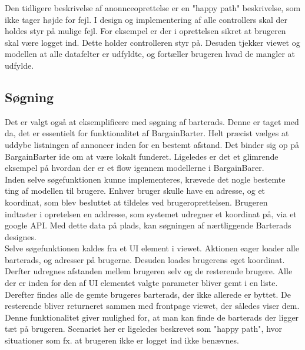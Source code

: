 \noindent Den tidligere beskrivelse af anonnceoprettelse er en "happy path" beskrivelse, som ikke tager højde for fejl. I design og implementering af alle controllers skal der holdes styr på mulige fejl. For eksempel er der i oprettelsen sikret at brugeren skal være logget ind. Dette holder controlleren styr på. Desuden tjekker viewet og modellen at alle datafelter er udfyldte, og fortæller brugeren hvad de mangler at udfylde.

\subsection{Søgning}     
Det er valgt også at eksemplificere med søgning af barterads. Denne er taget med da, det er essentielt for funktionalitet af BargainBarter. Helt præcist vælges at uddybe listningen af annoncer inden for en bestemt afstand. Det binder sig op på BargainBarter ide om at være lokalt funderet. Ligeledes er det et glimrende eksempel på hvordan der er et flow igennem modellerne i BargainBarer. \\

\noindent Inden selve søgefunktionen kunne implementeres, krævede det nogle bestemte ting af modellen til brugere. Enhver bruger skulle have en adresse, og et koordinat, som blev besluttet at tildeles ved brugeroprettelsen. Brugeren indtaster i opretelsen en addresse, som systemet udregner et koordinat på, via et google API. Med dette data på plads, kan søgningen af nærtliggende Barterads designes.\\

\noindent Selve søgefunktionen kaldes fra et UI element i viewet. Aktionen eager loader alle barterads, og adresser på brugerne. Desuden loades brugerens eget koordinat. Derfter udregnes afstanden mellem brugeren selv og de resterende brugere. Alle der er inden for den af UI elementet valgte parameter bliver gemt i en liste. Derefter findes alle de gemte brugeres barterads, der ikke allerede er byttet. De resterende bliver returneret sammen med frontpage viewet, der således viser dem. Denne funktionalitet giver mulighed for, at man kan finde de barterads der ligger tæt på brugeren. Scenariet her er ligeledes beskrevet som "happy path", hvor situationer som fx. at brugeren ikke er logget ind ikke benævnes.


